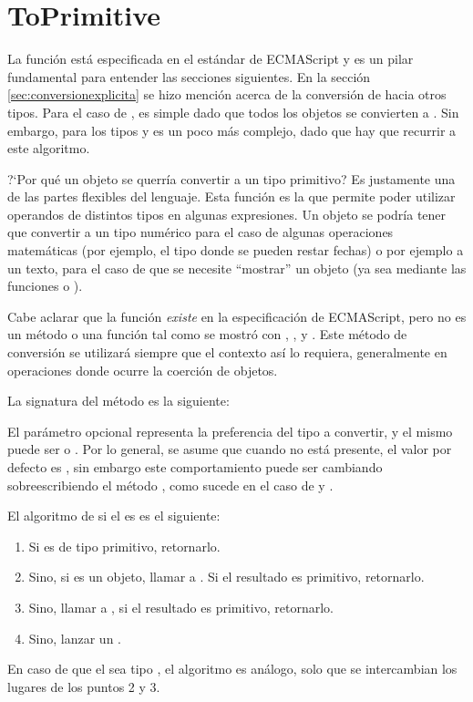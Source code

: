 \section{ToPrimitive}
\label{sec:toprimitive}

La función  está especificada en el estándar de ECMAScript \cite{EcmaScript:15} y es un pilar fundamental para entender las secciones siguientes. En la sección \ref{sec:conversionexplicita} se hizo mención acerca de la conversión de  hacia otros tipos. Para el caso de , es simple dado que todos los objetos se convierten a . Sin embargo, para los tipos  y  es un poco más complejo, dado que hay que recurrir a este algoritmo. 

?`Por qué un objeto se querría convertir a un tipo primitivo? Es justamente una de las partes flexibles del lenguaje. Esta función es la que permite poder utilizar operandos de distintos tipos en algunas expresiones. Un objeto se podría tener que convertir a un tipo numérico para el caso de algunas operaciones matemáticas (por ejemplo, el tipo  donde se pueden restar fechas) o por ejemplo a un texto, para el caso de que se necesite "`mostrar"' un objeto (ya sea mediante las funciones  o ).

Cabe aclarar que la función  \textit{existe} en la especificación de ECMAScript, pero no es un método o una función tal como se mostró con , ,  y . Este método de conversión se utilizará siempre que el contexto así lo requiera, generalmente en operaciones donde ocurre la coerción de objetos.

La signatura del método es la siguiente: 

El parámetro opcional  representa la preferencia del tipo a convertir, y el mismo puede ser  o . Por lo general, se asume que cuando no está presente, el valor por defecto es , sin embargo este comportamiento puede ser cambiando sobreescribiendo el método , como sucede en el caso de  y .

El algoritmo de  si el  es  es el siguiente:

\begin{enumerate}
\item Si  es de tipo primitivo, retornarlo.
\item Sino, si  es un objeto, llamar a . Si el resultado es primitivo, retornarlo.
\item Sino, llamar a , si el resultado es primitivo, retornarlo.
\item Sino, lanzar un .
\end{enumerate}

En caso de que el  sea tipo , el algoritmo es análogo, solo que se intercambian los lugares de los puntos 2 y 3.
